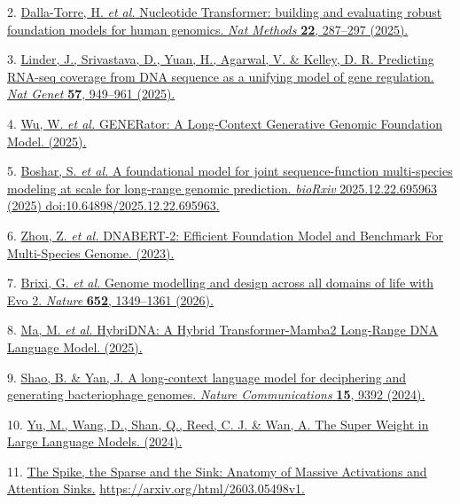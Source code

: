 \documentclass[11pt]{article}
\begin{document}
2. \href{http://paperpile.com/b/FLFbSd/hmJS}{Dalla-Torre, H. \emph{et
al.} Nucleotide Transformer: building and evaluating robust foundation
models for human genomics. \emph{Nat Methods} \textbf{22}, 287--297
(2025).}

3. \href{http://paperpile.com/b/FLFbSd/Tixt}{Linder, J., Srivastava, D.,
Yuan, H., Agarwal, V. \& Kelley, D. R. Predicting RNA-seq coverage from
DNA sequence as a unifying model of gene regulation. \emph{Nat Genet}
\textbf{57}, 949--961 (2025).}

4. \href{http://paperpile.com/b/FLFbSd/wsei}{Wu, W. \emph{et al.}
GENERator: A Long-Context Generative Genomic Foundation Model. (2025).}

5. \href{http://paperpile.com/b/FLFbSd/zg9K}{Boshar, S. \emph{et al.} A
foundational model for joint sequence-function multi-species modeling at
scale for long-range genomic prediction. \emph{bioRxiv}
2025.12.22.695963 (2025)
doi:}\href{http://dx.doi.org/10.64898/2025.12.22.695963}{10.64898/2025.12.22.695963}\href{http://paperpile.com/b/FLFbSd/zg9K}{.}

6. \href{http://paperpile.com/b/FLFbSd/5VVM}{Zhou, Z. \emph{et al.}
DNABERT-2: Efficient Foundation Model and Benchmark For Multi-Species
Genome. (2023).}

7. \href{http://paperpile.com/b/FLFbSd/j27Z}{Brixi, G. \emph{et al.}
Genome modelling and design across all domains of life with Evo 2.
\emph{Nature} \textbf{652}, 1349--1361 (2026).}

8. \href{http://paperpile.com/b/FLFbSd/HqTS}{Ma, M. \emph{et al.}
HybriDNA: A Hybrid Transformer-Mamba2 Long-Range DNA Language Model.
(2025).}

9. \href{http://paperpile.com/b/FLFbSd/0vKI}{Shao, B. \& Yan, J. A
long-context language model for deciphering and generating bacteriophage
genomes. \emph{Nature Communications} \textbf{15}, 9392 (2024).}

10. \href{http://paperpile.com/b/FLFbSd/h0C1}{Yu, M., Wang, D., Shan,
Q., Reed, C. J. \& Wan, A. The Super Weight in Large Language Models.
(2024).}

11. \href{http://paperpile.com/b/FLFbSd/XSIF}{The Spike, the Sparse and
the Sink: Anatomy of Massive Activations and Attention Sinks.}
\url{https://arxiv.org/html/2603.05498v1}\href{http://paperpile.com/b/FLFbSd/XSIF}{.}
\end{document}
